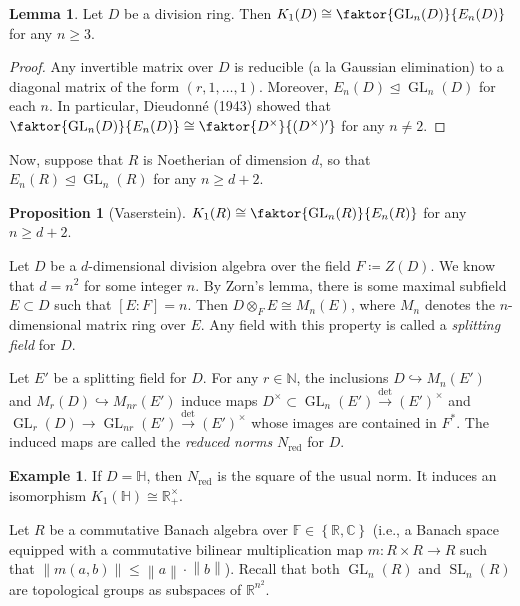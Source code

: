 \documentclass[10pt,letterpaper,cm]{nupset}
\theoremstyle{definition}
\newtheorem{exmp}[definition]{Example}
\theoremstyle{theorem}
\newtheorem{lemma}[definition]{Lemma}
\newtheorem{prop}[definition]{Proposition}
\theoremstyle{remark}
\newcommand{\C}{\mathbb C}
\renewcommand{\H}{\mathbb H}
\newcommand{\N}{\mathbb N}
\newcommand{\R}{\mathbb R}
\newcommand{\1}{\mathbf{1}}
\newcommand{\0}{\vec 0}
\DeclareMathOperator*{\GL}{GL}
\DeclareMathOperator*{\SL}{SL}
\DeclareMathOperator{\red}{red}
\begin{document}
\begin{lemma}
Let $D$ be a division ring. Then $K_1(D) \cong \faktor{\GL_n(D)}{E_n(D)}$ for any $n\geq 3$.
\end{lemma}
\begin{proof}
Any invertible matrix over $D$ is reducible (a la Gaussian elimination) to a diagonal matrix of the form $(r, 1, \ldots, 1)$. Moreover, $E_n(D)\unlhd \GL_n(D)$ for each $n$. In particular, Dieudonn\'e (1943) showed that  $\faktor{\GL_n(D)}{E_n(D)} \cong \faktor{D^{\times}}{(D^{\times})'}$ for any $n\ne 2$. 
\end{proof}

\smallskip

Now, suppose that $R$ is Noetherian of dimension $d$, so that $E_n(R)\unlhd \GL_n(R)$ for any $n\geq d+2$. 

\begin{prop}[Vaserstein]
$K_1(R) \cong \faktor{\GL_n(R)}{E_n(R)}$ for any $n \geq d+2$. 
\end{prop}

\medskip


Let $D$ be a $d$-dimensional division algebra over the field $F\coloneqq Z(D)$. We know that $d =n^2$ for some integer $n$. By Zorn's lemma, there is some maximal subfield $E\subset D$ such that $[E : F] = n$. Then $D \otimes_F E \cong M_n(E)$, where $M_n$ denotes the $n$-dimensional matrix ring over $E$. Any field with this property is called a \textit{splitting field} for $D$.

Let $E'$ be a splitting field for $D$. For any $r \in \N$, the inclusions $D \hookrightarrow M_n(E')$ and $M_r(D) \hookrightarrow M_{nr}(E')$ induce maps $D^{\times}\subset \GL_n(E') \overset{\det}{\longrightarrow} (E')^{\times}$ and $\GL_r(D)\to \GL_{nr}(E')  \overset{\det}{\longrightarrow} (E')^{\times}$ whose images are contained in $F^{\ast}$. The induced maps are called the \textit{reduced norms} $N_{\red}$ for $D$.

\begin{exmp}
If $D = \H$, then $N_{\red}$ is the square of the usual norm. It induces an isomorphism $K_1(\H) \cong \R_+^{\times}$.
\end{exmp}

\medskip

Let $R$ be a commutative Banach algebra over $\mathbb{F} \in \left\{\R, \C\right\}$ (i.e., a Banach space equipped with a commutative bilinear multiplication map $m : R \times R \to R$ such that $\left\lVert{m(a,b)}\right\rVert \leq \left\lVert{a}\right\rVert\cdot \left\lVert{b}\right\rVert$). Recall that both $\GL_n(R)$ and $\SL_n(R)$ are topological groups as subspaces of $\R^{n^2}$. 
\end{document}
